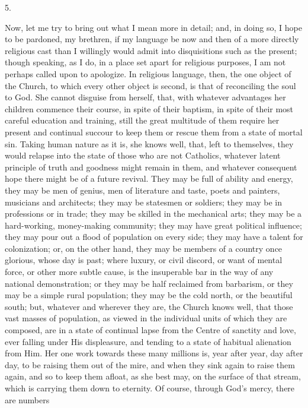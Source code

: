 5.

Now, let me try to bring out what I mean more in detail; and, in
doing so, I hope to be pardoned, my brethren, if my language be now
and then of a more directly religious cast than I willingly would
admit into disquisitions such as the present; though speaking, as I
do, in a place set apart for religious purposes, I am not perhaps
called upon to apologize. In religious language, then, the one object
of the Church, to which every other object is second, is that of
reconciling the soul to God. She cannot disguise from herself, that,
with whatever advantages her children commence their course, in spite
of their baptism, in spite of their most careful education and
training, still the great multitude of them require her present and
continual succour to keep them or rescue them from a state of mortal
sin. Taking human nature as it is, she knows well, that, left to
themselves, they would relapse into the state of those who are not
Catholics, whatever latent principle of truth and goodness might
remain in them, and whatever consequent hope there might be of a
future revival. They may be full of ability and energy, they may be
men of genius, men of literature and taste, poets and painters,
musicians and architects; they may be statesmen or soldiers; they may
be in professions or in trade; they may be skilled in the mechanical
arts; they may be a hard-working, money-making community; they may
have great political influence; they may pour out a flood of
population on every side; they may have a talent for colonization; or,
on the other hand, they may be members of a country once glorious,
whose day is past; where luxury, or civil discord, or want of mental
force, or other more subtle cause, is the insuperable bar in the way
of any national demonstration; or they may be half reclaimed from
barbarism, or they may be a simple rural population; they may be the
cold north, or the beautiful south; but, whatever and wherever they
are, the Church knows well, that those vast masses of population, as
viewed in the individual units of which they are composed, are in a
state of continual lapse from the Centre of sanctity and love, ever
falling under His displeasure, and tending to a state of habitual
alienation from Him. Her one work towards these many millions is, year
after year, day after day, to be raising them out of the mire, and
when they sink again to raise them again, and so to keep them afloat,
as she best may, on the surface of that stream, which is carrying them
down to eternity. Of course, through God's mercy, there are numbers
